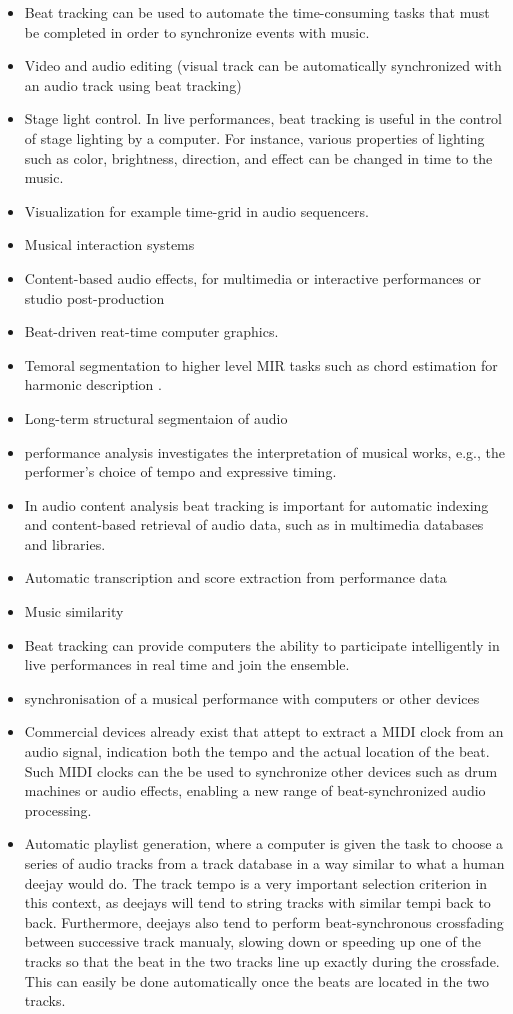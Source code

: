 \documentclass{scrartcl}
\begin{document}
\begin{itemize}
\item Beat tracking can be used to automate the time-consuming tasks that must be completed in order to synchronize events with music. 
\item Video and audio editing (visual track can be automatically synchronized with an audio track using beat tracking)
\item Stage light control. In live performances, beat tracking is useful in the control of stage lighting by a computer. For instance, various properties of lighting such as color, brightness, direction, and effect can be changed in time to the music.
\item Visualization for example time-grid in audio sequencers.
\item Musical interaction systems \cite{Robertson2007}
\item Content-based audio effects, for multimedia or interactive performances or studio post-production
\item Beat-driven reat-time computer graphics.
\item Temoral segmentation to higher level MIR tasks such as chord estimation for harmonic description \cite{Bello2005b}.
\item Long-term structural segmentaion of audio \cite{Bartsch2005}
\item performance analysis investigates the interpretation of musical works, e.g., the performer's choice of tempo and expressive timing. 
\item In audio content analysis beat tracking is important for automatic indexing and content-based retrieval of audio data, such as in multimedia databases and libraries.
\item Automatic transcription and score extraction from performance data 
\item Music similarity
\item Beat tracking can provide computers the ability to participate intelligently in live performances in real time and join the ensemble.
\item synchronisation of a musical performance with computers or other devices
\item Commercial devices already exist that attept to extract a MIDI clock from an audio signal, indication both the tempo and the actual location of the beat. Such MIDI clocks can the be used to synchronize other devices such as drum machines or audio effects, enabling a new range of beat-synchronized audio processing.
\item Automatic playlist generation, where a computer is given the task to choose a series of audio tracks from a track database in a way similar to what a human deejay would do. The track tempo is a very important selection criterion in this context, as deejays will tend to string tracks with similar tempi back to back. Furthermore, deejays also tend to perform beat-synchronous crossfading between successive track manualy, slowing down or speeding up one of the tracks so that the beat in the two tracks line up exactly during the crossfade. This can easily be done automatically once the beats are located in the two tracks.
\end{itemize}
\end{document}

